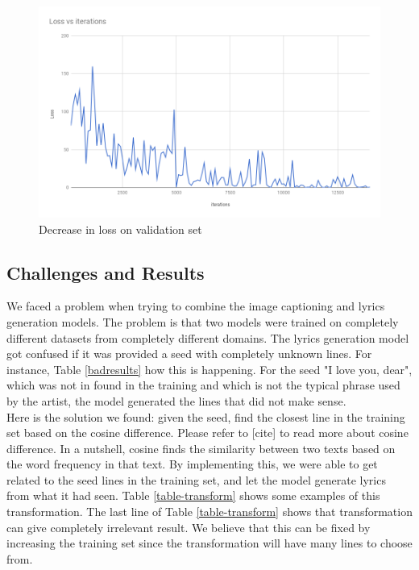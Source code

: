 \documentclass{article}
\begin{document}
\begin{figure}[!ht]
\centering
\includegraphics[scale=0.42]{loss.png}
\caption{Decrease in loss on validation set}
\label{fig:loss}
\end{figure}


\subsection{Challenges and Results}
We faced a problem when trying to combine the image captioning and lyrics generation models. The problem is that two models were trained on completely different datasets from completely different domains. The lyrics generation model got confused if it was provided a seed with completely unknown lines. For instance, Table \ref{badresults} how this is happening. For the seed "I love you, dear", which was not in found in the training and which is not the typical phrase used by the artist, the model generated the lines that did not make sense. \\

Here is the solution we found: given the seed, find the closest line in the training set based on the cosine difference. Please refer to [cite] to read more about cosine difference. In a nutshell, cosine finds the similarity between two texts based on the word frequency in that text. By implementing this, we were able to get related to the seed lines in the training set, and let the model generate lyrics from what it had seen. Table \ref{table-transform} shows some examples of this transformation. The last line of Table \ref{table-transform} shows that transformation can give completely irrelevant result. We believe that this can be fixed by increasing the training set since the transformation will have many lines to choose from. \\
\end{document}
